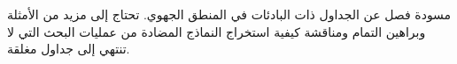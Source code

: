 \documentclass[../../../include/open-logic-chapter]{subfiles}
\begin{document}

\begin{editorial}
  مسودة فصل عن الجداول ذات البادئات في المنطق الجهوي. تحتاج إلى مزيد من
  الأمثلة وبراهين التمام ومناقشة كيفية استخراج النماذج المضادة من عمليات
  البحث التي لا تنتهي إلى جداول مغلقة.
\end{editorial}


\OLEndChapterHook
\end{document}
